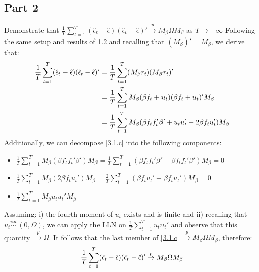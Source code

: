 \documentclass[12pt]{article}
\begin{document}
\subsection{Part 2} 
Demonstrate that $\frac{1}{T}\sum_{t=1}^{T}(\hat{\epsilon}_t-\hat{\epsilon})(\hat{\epsilon}_t-\hat{\epsilon})' \overset{p}{\to} M_\beta\Omega M_\beta$ as $T\to{+\infty}$
Following the same setup and results of 1.2 and recalling that $(M_\beta)' = M_\beta$, we derive that:
\begin{align} \label{3.1.c}
\frac{1}{T}\sum_{t=1}^{T}(\hat{\epsilon}_t-\hat{\epsilon})(\hat{\epsilon}_t-\hat{\epsilon})' &= \frac{1}{T}\sum_{t=1}^{T}(M_\beta r_t)(M_\beta r_t)' \notag\\
&= \frac{1}{T}\sum_{t=1}^{T} M_\beta(\beta f_t + u_t)(\beta f_t + u_t)'M_\beta \notag\\
&= \frac{1}{T}\sum_{t=1}^{T}M_\beta (\beta f_t f_t' \beta' + u_t u_t' + 2\beta f_t u_t') M_\beta  
\end{align} 
Additionally, we can decompose \ref{3.1.c} into the following components:
 \begin{itemize}
 \item $\frac{1}{T}\sum_{t=1}^{T}M_\beta(\beta f_t f_t' \beta') M_\beta = \frac{1}{T}\sum_{t=1}^{T}(\beta f_t f_t' \beta' - \beta f_t f_t' \beta')M_\beta = 0$ 
 \item $\frac{1}{T}\sum_{t=1}^{T}M_\beta(2\beta f_t u_t')M_\beta = \frac{2}{T}\sum_{t=1}^{T}(\beta f_t u_t'-\beta f_t u_t')M_\beta = 0$
 \item $\frac{1}{T}\sum_{t=1}^{T}M_\beta u_t u_t' M_\beta$
 \end{itemize}
 Assuming: i) the fourth moment of $u_t$ exists and is finite and ii) recalling that $u_t \overset{iid}{\sim} \: (0,\Omega)$, we can apply the LLN on $\frac{1}{T}\sum_{t=1}^{T} u_t u_t'$ and observe that this quantity $\overset{p}{\to} \Omega$.
 It follows that the last member of \ref{3.1.c} $\overset{p}{\to} M_\beta \Omega M_\beta$, therefore:
\begin{align} \label{3.2.b}
\frac{1}{T}\sum_{t=1}^{T}(\hat{\epsilon_t}-\hat{\epsilon})(\hat{\epsilon_t}-\hat{\epsilon})' \overset{p}{\to} M_\beta \Omega M_\beta \\ \notag 
\end{align}    
\end{document}
